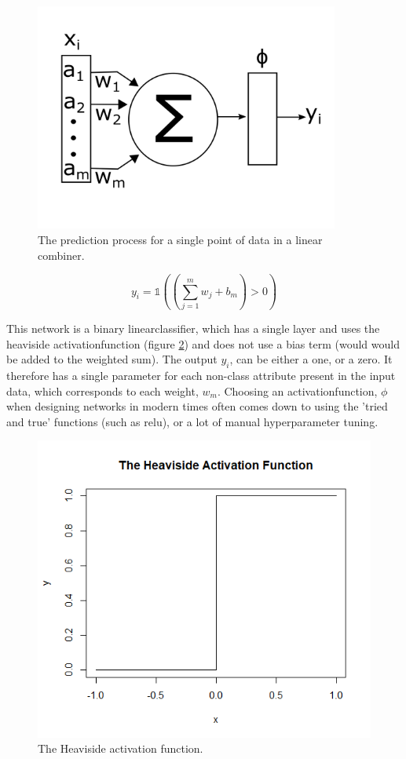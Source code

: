 \begin{figure}
    \centering
    \includegraphics[width=100mm]{figs/nn_simple.png}
    \caption{The prediction process for a single point of data in a linear combiner.}
    \label{fig:nn_simple}
\end{figure}

\begin{equation}
    y_i = \mathds{1} ((\sum_{j = 1}^m w_j + b_m) > 0)
    \label{eq:nn_simple_pred}
\end{equation}

This network is a binary \gls{linearclassifier}, which has a single \gls{layer} and uses the heaviside \gls{activationfunction} (figure \ref{fig:heavi_function}) and does not use a bias term (would would be added to the weighted sum). The output $y_i$, can be either a one, or a zero. It therefore has a single parameter for each non-class attribute present in the input data, which corresponds to each weight, $w_m$. Choosing an \gls{activationfunction}, $\phi$ when designing networks in modern times often comes down to using the 'tried and true' functions (such as \gls{relu}), or a lot of manual \gls{hyperparameter} tuning.

\begin{figure}
    \includegraphics[scale=0.5]{figs/heavi.png}
    \caption{The Heaviside activation function.}
    \label{fig:heavi_function}
\end{figure}

